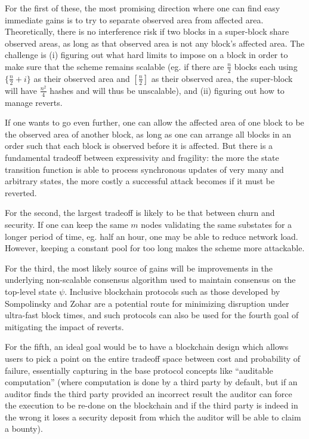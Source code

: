 \documentclass[11pt,a4paper]{report}
\theoremstyle{plain}
\theoremstyle{definition}
\theoremstyle{remark}
\begin{document}
For the first of these, the most promising direction where one can find easy immediate gains is to try to separate observed area from affected area. Theoretically, there is no interference risk if two blocks in a super-block share observed areas, as long as that observed area is not any block's affected area. The challenge is (i) figuring out what hard limits to impose on a block in order to make sure that the scheme remains scalable (eg. if there are $\frac{n}{2}$ blocks each using $\{\frac{n}{2}+i\}$ as their observed area and $[\frac{n}{2}]$ as their observed area, the super-block will have $\frac{n^2}{4}$ hashes and will thus be unscalable), and (ii) figuring out how to manage reverts.

If one wants to go even further, one can allow the affected area of one block to be the observed area of another block, as long as one can arrange all blocks in an order such that each block is observed before it is affected. But there is a fundamental tradeoff between expressivity and fragility: the more the state transition function is able to process synchronous updates of very many and arbitrary states, the more costly a successful attack becomes if it must be reverted.

For the second, the largest tradeoff is likely to be that between churn and security. If one can keep the same $m$ nodes validating the same substates for a longer period of time, eg. half an hour, one may be able to reduce network load. However, keeping a constant pool for too long makes the scheme more attackable.

For the third, the most likely source of gains will be improvements in the underlying non-scalable consensus algorithm used to maintain consensus on the top-level state $\psi$. Inclusive blockchain protocols such as those developed by Sompolinsky and Zohar \cite{inclusive} are a potential route for minimizing disruption under ultra-fast block times, and such protocols can also be used for the fourth goal of mitigating the impact of reverts.

For the fifth, an ideal goal would be to have a blockchain design which allows users to pick a point on the entire tradeoff space between cost and probability of failure, essentially capturing in the base protocol concepts like ``auditable computation'' \cite{auditable} (where computation is done by a third party by default, but if an auditor finds the third party provided an incorrect result the auditor can force the execution to be re-done on the blockchain and if the third party is indeed in the wrong it loses a security deposit from which the auditor will be able to claim a bounty).
\end{document}
